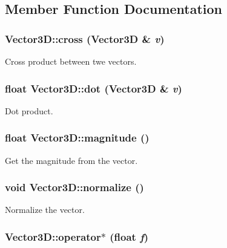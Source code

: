 \subsection{Member Function Documentation}
\hypertarget{classVector3D_aae87a11cc2fc08fdcde299dc50c23fe1}{
\subsubsection[{cross}]{ Vector3D::cross ({\bf Vector3D} \& {\em v})}}
\label{classVector3D_aae87a11cc2fc08fdcde299dc50c23fe1}
Cross product between twe vectors. \hypertarget{classVector3D_a4c7a7f410edb124026448080f6f0d72a}{
\subsubsection[{dot}]{\setlength{\rightskip}{0pt plus 5cm}float Vector3D::dot ({\bf Vector3D} \& {\em v})}}
\label{classVector3D_a4c7a7f410edb124026448080f6f0d72a}
Dot product. \hypertarget{classVector3D_a1139cce4839680afb01a9612eda6e117}{
\subsubsection[{magnitude}]{\setlength{\rightskip}{0pt plus 5cm}float Vector3D::magnitude ()}}
\label{classVector3D_a1139cce4839680afb01a9612eda6e117}
Get the magnitude from the vector. \hypertarget{classVector3D_abfb12ecb9c9beb88e095cc4a1a512d3c}{
\subsubsection[{normalize}]{\setlength{\rightskip}{0pt plus 5cm}void Vector3D::normalize ()}}
\label{classVector3D_abfb12ecb9c9beb88e095cc4a1a512d3c}
Normalize the vector. \hypertarget{classVector3D_a5a36ff390f5954f79687a3921e031553}{
\subsubsection[{operator$\ast$}]{ Vector3D::operator$\ast$ (float {\em f})}}
